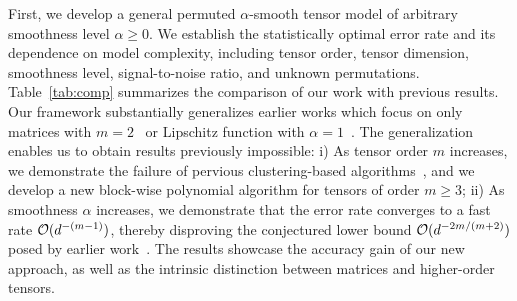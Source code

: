 \documentclass[11pt]{article}
\theoremstyle{definition}
\begin{document}
First, we develop a general permuted $\alpha$-smooth tensor model of arbitrary smoothness level $\alpha\geq 0$. We establish the statistically optimal error rate and its dependence on model complexity, including tensor order, tensor dimension, smoothness level, signal-to-noise ratio, and unknown permutations. Table~\ref{tab:comp} summarizes the comparison of our work with previous results.  Our framework substantially generalizes earlier works which focus on only matrices with $m=2$~\citep{gao2015rate,klopp2017oracle} or Lipschitz function with $\alpha=1$~\citep{balasubramanian2021nonparametric,li2019nearest}. The generalization enables us to obtain results previously impossible: i) As tensor order $m$ increases, we demonstrate the failure of pervious clustering-based algorithms~\citep{balasubramanian2021nonparametric,gao2015rate}, and we develop a new block-wise polynomial algorithm for tensors of order $m\geq 3$; ii) As smoothness $\alpha$ increases, we demonstrate that the error rate converges to a fast rate $\mathcal{O}(d^{-(m-1)})$, thereby disproving the conjectured lower bound $\mathcal{O}(d^{-2m/(m+2)})$ posed by earlier work~\citep{balasubramanian2021nonparametric}. The results showcase the accuracy gain of our new approach, as well as the intrinsic distinction between matrices and higher-order tensors. 

 \begin{table}[t!]
    \centering
    \caption{Comparison of our results with previous work. $^*$For simplicity, we list here the error rate (omitting the log term) for $\infty$-smooth tensors. Our results allow general tensors of arbitrary smoothness level $\alpha\geq 0$; See Theorems~\ref{thm:LSE}-\ref{thm:BC} in Sections~\ref{sec:lse}-\ref{sec:borda}.}\label{tab:comp}
\end{table}
\end{document}
